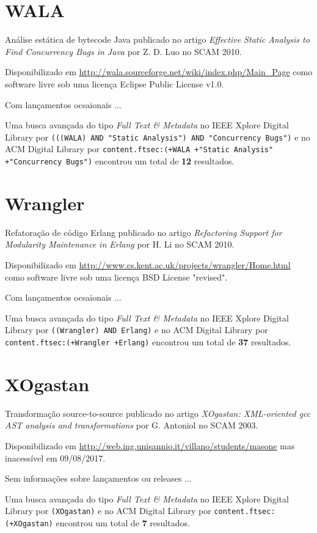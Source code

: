 \section{WALA}

Análise estática de bytecode Java
publicado no artigo {\it Effective Static Analysis to Find Concurrency Bugs in Java}
por Z. D. Luo
no SCAM 2010.

Disponibilizado em \url{http://wala.sourceforge.net/wiki/index.php/Main_Page}
como software livre
sob uma licença Eclipse Public License v1.0.

Com lançamentos ocsaionais ...


Uma busca avançada do tipo {\it Full Text \& Metadata} no IEEE Xplore Digital Library por
\texttt{(((WALA) AND "Static Analysis") AND "Concurrency Bugs")}
e no ACM Digital Library por
\texttt{content.ftsec:(+WALA +"Static Analysis" +"Concurrency Bugs")}
encontrou um total de
{\bf 12}
resultados.

\section{Wrangler}

Refatoração de código Erlang
publicado no artigo {\it Refactoring Support for Modularity Maintenance in Erlang}
por H. Li
no SCAM 2010.

Disponibilizado em \url{http://www.cs.kent.ac.uk/projects/wrangler/Home.html}
como software livre
sob uma licença BSD License "revised".

Com lançamentos ocsaionais ...


Uma busca avançada do tipo {\it Full Text \& Metadata} no IEEE Xplore Digital Library por
\texttt{((Wrangler) AND Erlang)}
e no ACM Digital Library por
\texttt{content.ftsec:(+Wrangler +Erlang)}
encontrou um total de
{\bf 37}
resultados.

\section{XOgastan}

Transformação source-to-source
publicado no artigo {\it XOgastan: XML-oriented gcc AST analysis and transformations}
por G. Antoniol
no SCAM 2003.

Disponibilizado em \url{http://web.ing.unisannio.it/villano/students/masone}
mas inacessível em 09/08/2017.

Sem informações sobre lançamentos ou releases ...


Uma busca avançada do tipo {\it Full Text \& Metadata} no IEEE Xplore Digital Library por
\texttt{(XOgastan)}
e no ACM Digital Library por
\texttt{content.ftsec:(+XOgastan)}
encontrou um total de
{\bf 7}
resultados.


